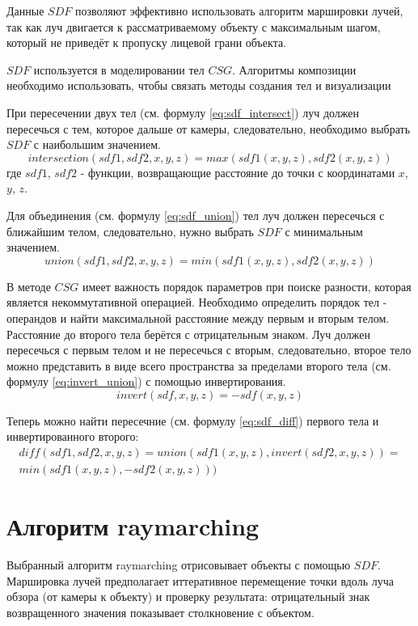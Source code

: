 Данные $SDF$ позволяют эффективно использовать алгоритм маршировки лучей, так как луч двигается
к рассматриваемому объекту с максимальным шагом, который не приведёт к пропуску лицевой грани объекта.

$SDF$ используется в моделировании тел $CSG$.
Алгоритмы композиции необходимо использовать, чтобы связать методы создания тел и визуализации

При пересечении двух тел (см. формулу \ref{eq:sdf_intersect}) луч должен пересечься с тем, которое дальше от камеры, следовательно,
необходимо выбрать $SDF$ с наибольшим значением.
\begin{equation} \label{eq:sdf_intersect}
  intersection(sdf1, sdf2, x, y, z) = max(sdf1(x, y, z), sdf2(x, y, z))
\end{equation}
где $sdf1$, $sdf2$ - функции, возвращающие расстояние до точки с координатами $x$, $y$, $z$.

Для объединения (см. формулу \ref{eq:sdf_union}) тел луч должен пересечься с ближайшим телом, следовательно, 
нужно выбрать $SDF$ с минимальным значением.
\begin{equation} \label{eq:sdf_union}
  union(sdf1, sdf2, x, y, z) = min(sdf1(x, y, z), sdf2(x, y, z))
\end{equation}

В методе $CSG$ имеет важность порядок параметров при поиске разности, которая является некоммутативной операцией.
Необходимо определить порядок тел - операндов и найти максимальной расстояние между первым и вторым телом.
Расстояние до второго тела берётся с отрицательным знаком.
Луч должен пересечься с первым телом и не пересечься с вторым, следовательно, второе тело
можно представить в виде всего пространства за пределами второго тела (см. формулу \ref{eq:invert_union}) с помощью
инвертирования. 
\begin{equation} \label{eq:invert_union}
  invert(sdf, x, y, z) = -sdf(x, y, z)
\end{equation}

Теперь можно найти пересечние (см. формулу \ref{eq:sdf_diff}) первого тела и инвертированного второго:
\begin{multline} \label{eq:sdf_diff}
  diff(sdf1, sdf2, x, y, z) = union(sdf1(x, y, z), invert(sdf2, x, y, z)) =\\
  min(sdf1(x, y, z), -sdf2(x, y, z)))
\end{multline}

\section{Алгоритм raymarching}\label{alg:raymarch}
Выбранный алгоритм raymarching отрисовывает объекты с помощью $SDF$.
Маршировка лучей предполагает иттеративное перемещение точки вдоль луча обзора (от камеры к объекту) и проверку
результата: отрицательный знак возвращенного значения показывает столкновение с объектом. 

